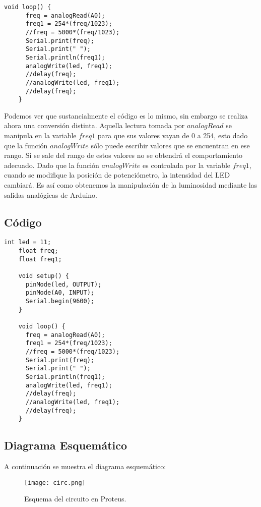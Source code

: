 \documentclass[12pt, letterpaper]{article}
\begin{document}
\begin{lstlisting}[language=Arduino]
	void loop() { 
	  freq = analogRead(A0);
	  freq1 = 254*(freq/1023);
	  //freq = 5000*(freq/1023); 
	  Serial.print(freq);
	  Serial.print(" ");
	  Serial.println(freq1);
	  analogWrite(led, freq1);
	  //delay(freq);
	  //analogWrite(led, freq1);
	  //delay(freq);
	}
\end{lstlisting}

Podemos ver que sustancialmente el código es lo mismo, sin embargo se realiza ahora una conversión distinta. Aquella lectura tomada por $analogRead$ se manipula en la variable $freq1$ para que sus valores vayan de 0 a 254, esto dado que la función $analogWrite$ sólo puede escribir valores que se encuentran en ese rango. Si se sale del rango de estos valores no se obtendrá el comportamiento adecuado. Dado que la función $analogWrite$ es controlada por la variable $freq1$, cuando se modifique la posición de potenciómetro, la intensidad del LED cambiará. Es así como obtenemos la manipulación de la luminosidad mediante las salidas analógicas de Arduino.

\subsection*{Código}

\begin{lstlisting}[language=Arduino]
	int led = 11;
	float freq;
	float freq1;

	void setup() {
	  pinMode(led, OUTPUT);
	  pinMode(A0, INPUT);
	  Serial.begin(9600);
	}

	void loop() { 
	  freq = analogRead(A0);
	  freq1 = 254*(freq/1023);
	  //freq = 5000*(freq/1023); 
	  Serial.print(freq);
	  Serial.print(" ");
	  Serial.println(freq1);
	  analogWrite(led, freq1);
	  //delay(freq);
	  //analogWrite(led, freq1);
	  //delay(freq);
	}
\end{lstlisting}

\subsection*{Diagrama Esquemático}

A continuación se muestra el diagrama esquemático:

\begin{figure}[H]
	\centering
	\texttt{[image: circ.png]}
	\caption{Esquema del circuito en Proteus.}
\end{figure}
\end{document}
